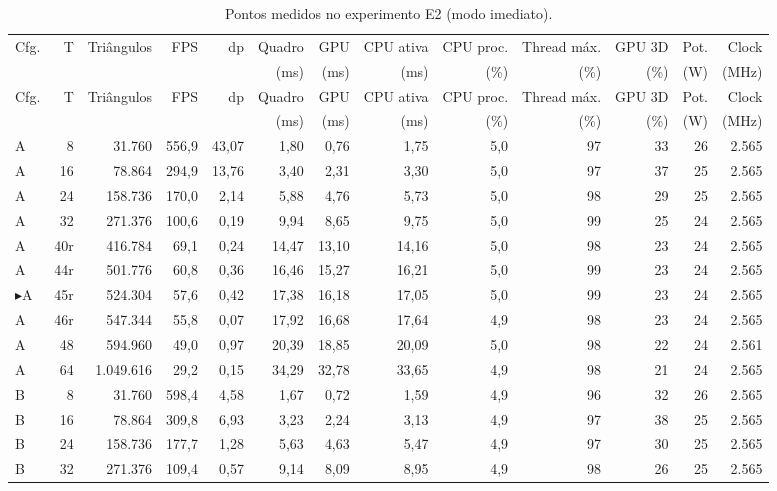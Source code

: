 {\scriptsize
\setlength{\tabcolsep}{2.6pt}
\begin{longtable}{l r r r r r r r r r r r r}
\caption{Pontos medidos no experimento E2 (modo imediato).}\label{tab:pontos_e2}\\
\toprule
Cfg. & T & Triângulos & FPS & dp & Quadro & GPU & CPU ativa & CPU proc. & Thread máx. & GPU 3D & Pot. & Clock \\
 & & & & & (ms) & (ms) & (ms) & (\%) & (\%) & (\%) & (W) & (MHz) \\
\midrule
\endfirsthead
\toprule
Cfg. & T & Triângulos & FPS & dp & Quadro & GPU & CPU ativa & CPU proc. & Thread máx. & GPU 3D & Pot. & Clock \\
 & & & & & (ms) & (ms) & (ms) & (\%) & (\%) & (\%) & (W) & (MHz) \\
\midrule
\endhead
A & 8 & 31.760 & 556,9 & 43,07 & 1,80 & 0,76 & 1,75 & 5,0 & 97 & 33 & 26 & 2.565 \\
A & 16 & 78.864 & 294,9 & 13,76 & 3,40 & 2,31 & 3,30 & 5,0 & 97 & 37 & 25 & 2.565 \\
A & 24 & 158.736 & 170,0 & 2,14 & 5,88 & 4,76 & 5,73 & 5,0 & 98 & 29 & 25 & 2.565 \\
A & 32 & 271.376 & 100,6 & 0,19 & 9,94 & 8,65 & 9,75 & 5,0 & 99 & 25 & 24 & 2.565 \\
A & 40r & 416.784 & 69,1 & 0,24 & 14,47 & 13,10 & 14,16 & 5,0 & 98 & 23 & 24 & 2.565 \\
A & 44r & 501.776 & 60,8 & 0,36 & 16,46 & 15,27 & 16,21 & 5,0 & 99 & 23 & 24 & 2.565 \\
$\blacktriangleright$A & 45r & 524.304 & 57,6 & 0,42 & 17,38 & 16,18 & 17,05 & 5,0 & 99 & 23 & 24 & 2.565 \\
A & 46r & 547.344 & 55,8 & 0,07 & 17,92 & 16,68 & 17,64 & 4,9 & 98 & 23 & 24 & 2.565 \\
A & 48 & 594.960 & 49,0 & 0,97 & 20,39 & 18,85 & 20,09 & 5,0 & 98 & 22 & 24 & 2.561 \\
A & 64 & 1.049.616 & 29,2 & 0,15 & 34,29 & 32,78 & 33,65 & 4,9 & 98 & 21 & 24 & 2.565 \\
\midrule
B & 8 & 31.760 & 598,4 & 4,58 & 1,67 & 0,72 & 1,59 & 4,9 & 96 & 32 & 26 & 2.565 \\
B & 16 & 78.864 & 309,8 & 6,93 & 3,23 & 2,24 & 3,13 & 4,9 & 97 & 38 & 25 & 2.565 \\
B & 24 & 158.736 & 177,7 & 1,28 & 5,63 & 4,63 & 5,47 & 4,9 & 97 & 30 & 25 & 2.565 \\
B & 32 & 271.376 & 109,4 & 0,57 & 9,14 & 8,09 & 8,95 & 4,9 & 98 & 26 & 25 & 2.565 \\

\end{longtable}}
